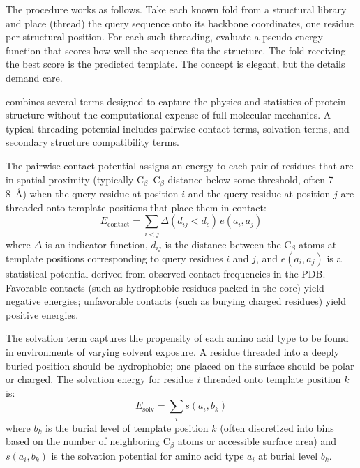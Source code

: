 The procedure works as follows. Take each known fold from a structural library and place (thread) the query sequence onto its backbone coordinates, one residue per structural position. For each such threading, evaluate a pseudo-energy function that scores how well the sequence fits the structure. The fold receiving the best score is the predicted template. The concept is elegant, but the details demand care.

 combines several terms designed to capture the physics and statistics of protein structure without the computational expense of full molecular mechanics. A typical threading potential includes pairwise contact terms, solvation terms, and secondary structure compatibility terms.

The pairwise contact potential assigns an energy to each pair of residues that are in spatial proximity (typically C$_\beta$--C$_\beta$ distance below some threshold, often 7--8~\AA) when the query residue at position $i$ and the query residue at position $j$ are threaded onto template positions that place them in contact:
\begin{equation}
E_{\text{contact}} = \sum_{i < j} \Delta(d_{ij} < d_c)\, e(a_i, a_j)
\label{eq:contact-potential}
\end{equation}
where $\Delta$ is an indicator function, $d_{ij}$ is the distance between the C$_\beta$ atoms at template positions corresponding to query residues $i$ and $j$, and $e(a_i, a_j)$ is a statistical potential derived from observed contact frequencies in the PDB. Favorable contacts (such as hydrophobic residues packed in the core) yield negative energies; unfavorable contacts (such as burying charged residues) yield positive energies.

The solvation term captures the propensity of each amino acid type to be found in environments of varying solvent exposure. A residue threaded into a deeply buried position should be hydrophobic; one placed on the surface should be polar or charged. The solvation energy for residue $i$ threaded onto template position $k$ is:
\begin{equation}
E_{\text{solv}} = \sum_i s(a_i, b_k)
\label{eq:solvation}
\end{equation}
where $b_k$ is the burial level of template position $k$ (often discretized into bins based on the number of neighboring C$_\beta$ atoms or accessible surface area) and $s(a_i, b_k)$ is the solvation potential for amino acid type $a_i$ at burial level $b_k$.

